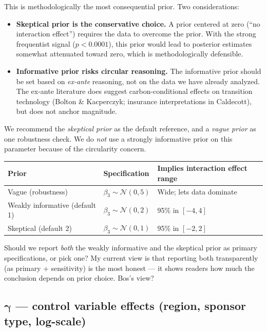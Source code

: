 \documentclass[11pt,a4paper]{article}
\newcommand{\N}{\mathcal{N}}
\begin{document}
\begin{rationale}
This is methodologically the most consequential prior. Two considerations:
\begin{itemize}
  \item \textbf{Skeptical prior is the conservative choice.} A prior centered at zero (``no interaction effect'') requires the data to overcome the prior. With the strong frequentist signal ($p < 0.0001$), this prior would lead to posterior estimates somewhat attenuated toward zero, which is methodologically defensible.
  \item \textbf{Informative prior risks circular reasoning.} The informative prior should be set based on \emph{ex-ante} reasoning, not on the data we have already analyzed. The ex-ante literature does suggest carbon-conditional effects on transition technology (Bolton \& Kacperczyk; insurance interpretations in Caldecott), but does not anchor magnitude.
\end{itemize}
We recommend the \emph{skeptical prior} as the default reference, and a \emph{vague prior} as one robustness check. We do \emph{not} use a strongly informative prior on this parameter because of the circularity concern.
\end{rationale}

\begin{table}[h]
\centering
\begin{tabular}{lll}
\toprule
\textbf{Prior} & \textbf{Specification} & \textbf{Implies interaction effect range} \\
\midrule
Vague (robustness) & $\beta_3 \sim \N(0, 5)$ & Wide; lets data dominate \\
Weakly informative (default 1) & $\beta_3 \sim \N(0, 2)$ & 95\% in $[-4, 4]$ \\
Skeptical (default 2) & $\beta_3 \sim \N(0, 1)$ & 95\% in $[-2, 2]$ \\
\bottomrule
\end{tabular}
\end{table}

\begin{openquestion}
Should we report \emph{both} the weakly informative and the skeptical prior as primary specifications, or pick one? My current view is that reporting both transparently (as primary + sensitivity) is the most honest --- it shows readers how much the conclusion depends on prior choice. Bos's view?
\end{openquestion}

\subsection{$\bm{\gamma}$ --- control variable effects (region, sponsor type, log-scale)}
\end{document}
